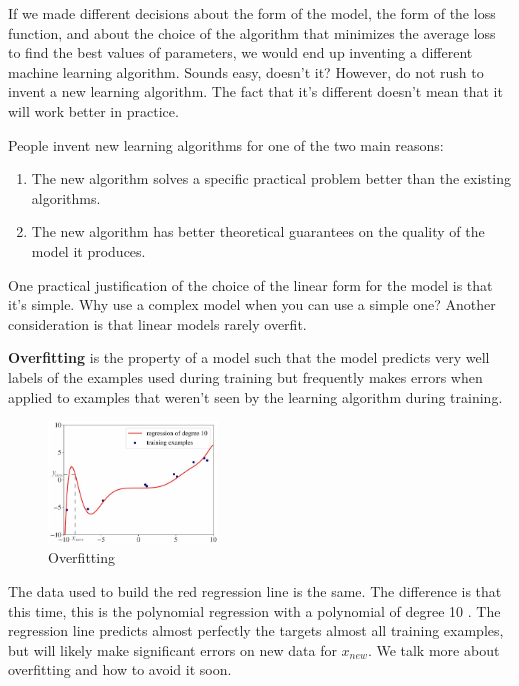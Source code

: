 \documentclass[9pt,dvipsnames]{beamer}
\begin{document}
\begin{frame}
	If we made different decisions about the form of the model, the form of the loss function, and about the choice of the algorithm that minimizes the average loss to find the best values of parameters, we would end up inventing a different machine learning algorithm. Sounds easy, doesn't it? However, do not rush to invent a new learning algorithm. The fact that it's different doesn't mean that it will work better in practice.
	
	People invent new learning algorithms for one of the two main reasons:
	\begin{enumerate}
		\item The new algorithm solves a specific practical problem better than the existing algorithms.
		\item The new algorithm has better theoretical guarantees on the quality of the model it produces.
	\end{enumerate}
	One practical justification of the choice of the linear form for the model is that it's simple. Why use a complex model when you can use a simple one? Another consideration is that linear models rarely overfit.
\end{frame}

\begin{frame}
	\textbf{Overfitting} is the property of a model such that the model predicts very well labels of the examples used during training but frequently makes errors when applied to examples that weren't seen by the learning algorithm during training.
	\begin{figure}
		\centering
		\includegraphics[width=0.4\textwidth]{imgs/algorithm_2.jpg}
		\caption{Overfitting}
	\end{figure}
	The data used to build the red regression line is the same. The difference is that this time, this is the polynomial regression with a polynomial of degree 10 . The regression line predicts almost perfectly the targets almost all training examples, but will likely make significant errors on new data for $x_{n e w}$. We talk more about overfitting and how to avoid it soon.
\end{frame}
\end{document}
